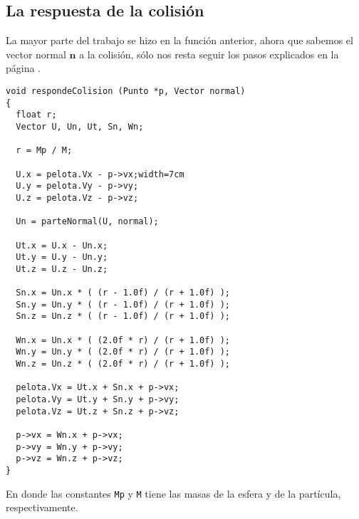 \subsection{La respuesta de la colisión}
La mayor parte del trabajo se hizo en la función anterior, ahora que sabemos el vector normal $\textbf{n}$ a la colisión, sólo nos resta seguir los pasos explicados en la página \pageref{alg:elasmov}.
\begin{verbatim}
void respondeColision (Punto *p, Vector normal)
{
  float r;
  Vector U, Un, Ut, Sn, Wn;

  r = Mp / M;

  U.x = pelota.Vx - p->vx;width=7cm
  U.y = pelota.Vy - p->vy;
  U.z = pelota.Vz - p->vz;

  Un = parteNormal(U, normal);

  Ut.x = U.x - Un.x;
  Ut.y = U.y - Un.y;
  Ut.z = U.z - Un.z;

  Sn.x = Un.x * ( (r - 1.0f) / (r + 1.0f) );
  Sn.y = Un.y * ( (r - 1.0f) / (r + 1.0f) );
  Sn.z = Un.z * ( (r - 1.0f) / (r + 1.0f) );

  Wn.x = Un.x * ( (2.0f * r) / (r + 1.0f) );
  Wn.y = Un.y * ( (2.0f * r) / (r + 1.0f) );
  Wn.z = Un.z * ( (2.0f * r) / (r + 1.0f) );

  pelota.Vx = Ut.x + Sn.x + p->vx;
  pelota.Vy = Ut.y + Sn.y + p->vy;
  pelota.Vz = Ut.z + Sn.z + p->vz;

  p->vx = Wn.x + p->vx;
  p->vy = Wn.y + p->vy;
  p->vz = Wn.z + p->vz;
}
\end{verbatim}
En donde las constantes \verb|Mp| y \verb|M| tiene las masas de la esfera y de la partícula, respectivamente.

